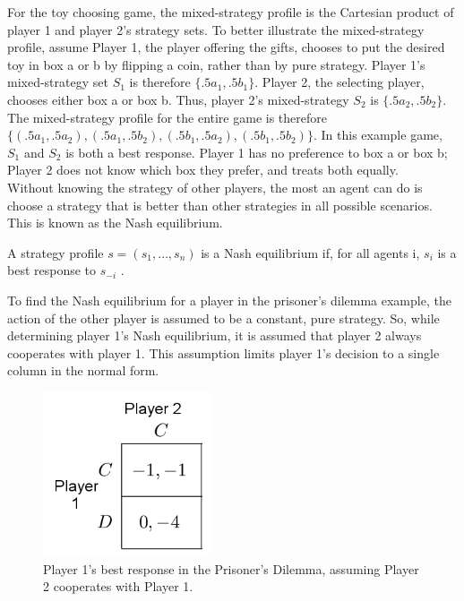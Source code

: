 For the toy choosing game, the mixed-strategy profile is the Cartesian product of player 1 and player 2's strategy sets. To better illustrate the mixed-strategy profile, assume Player 1, the player offering the gifts, chooses to put the desired toy in box a or b by flipping a coin, rather than by pure strategy. Player 1's mixed-strategy set $S_1$ is therefore $\{.5a_1, .5b_1\}$. Player 2, the selecting player, chooses either box a or box b. Thus, player 2's mixed-strategy $S_2$ is $\{.5a_2, .5b_2\}$. The mixed-strategy profile for the entire game is therefore $\{(.5a_1, .5a_2), (.5a_1, .5b_2), (.5b_1, .5a_2), (.5b_1, .5b_2)\}$. In this example game, $S_1$ and $S_2$ is both a best response. Player 1 has no preference to box a or box b; Player 2 does not know which box they prefer, and treats both equally.\\

Without knowing the strategy of other players, the most an agent can do is choose a strategy that is better than other strategies in all possible scenarios. This is known as the Nash equilibrium.

\begin{define}
  A strategy profile $s=(s_1,\dots ,s_n)$ is a Nash equilibrium if, for all agents i, $s_i$ is a best response to $s_{-i}$ \cite{shoh09}.
\end{define}

To find the Nash equilibrium for a player in the prisoner's dilemma example, the action of the other player is assumed to be a constant, pure strategy. So, while determining player 1's Nash equilibrium, it is assumed that player 2 always cooperates with player 1. This assumption limits player 1's decision to a single column in the normal form.
\begin{figure}[H]
  \centering
  \includegraphics[width=5cm]{figures/ExamplePartialCol1.png}
  \caption{Player 1's best response in the Prisoner's Dilemma, assuming Player 2 cooperates with Player 1.}
  \label{fig:NashCol1}
\end{figure}

